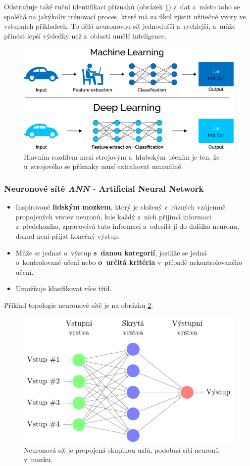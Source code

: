 Odstraňuje také ruční identifikaci příznaků (obrázek \ref{fig:ml_vs_ann}) z~dat a~místo toho se spoléhá na jakýkoliv trénovací proces, které má za úkol zjistit užitečné vzory ve vstupních příkladech. To dělá neuronovou síť jednodušší a~rychlejší, a~může přinést lepší výsledky než z~oblasti umělé inteligence.

\begin{figure}[H]
\centering
\includegraphics[width=.85\linewidth]{assets/9_ml_vs_ann}
\caption{Hlavním rozdílem mezi strojovým a~hlubokým učením je ten, že u~strojového se příznaky musí extrahovat manuálně.}
	\label{fig:ml_vs_ann}
\end{figure}

\subsubsection{Neuronové sítě \textit{ANN} - Artificial Neural Network}
\begin{itemize}
  \item Inspirované \textbf{lidským mozkem}, který je složený z~různých vzájemně propojených vrstev neuronů, kde každý z~nich přijímá informaci z~předchozího, zpracovává tuto informaci a~odesílá jí do dalšího neuronu, dokud není přijat konečný výstup.
  \item Může se jednat o~výstup \textbf{s~danou kategorií}, jestliže se jedná o~kontrolované učení nebo \textbf{o~určitá kritéria} v~případě nekontrolovaného učení.
  \item Umožňuje klasifikovat více tříd.
\end{itemize}
Příklad topologie neuronové sítě je na obrázku \ref{fig:ann}. 
\begin{figure}[H]
\centering
\includegraphics[width=.6\linewidth]{assets/9_ann.pdf}
\caption{Neuronová síť je propojená skupinou uzlů, podobná síti neuronů v~mozku.}
\label{fig:ann}
\end{figure}

